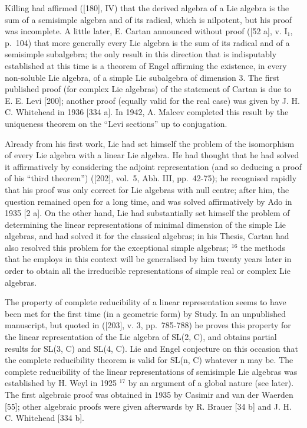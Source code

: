 Killing had affirmed ({[}180{]}, IV) that the derived algebra of a Lie algebra is the sum of a semisimple algebra and of its radical, which is nilpotent, but his proof was incomplete. A little later, E. Cartan announced without proof ({[}52 a{]}, v. I₁, p.~104) that more generally every Lie algebra is the sum of its radical and of a semisimple subalgebra; the only result in this direction that is indisputably established at this time is a theorem of Engel affirming the existence, in every non-soluble Lie algebra, of a simple Lie subalgebra of dimension 3. The first published proof (for complex Lie algebras) of the statement of Cartan is due to E. E. Levi {[}200{]}; another proof (equally valid for the real case) was given by J. H. C. Whitehead in 1936 {[}334 a{]}. In 1942, A. Malcev completed this result by the uniqueness theorem on the ``Levi sections'' up to conjugation.

Already from his first work, Lie had set himself the problem of the isomorphism of every Lie algebra with a linear Lie algebra. He had thought that he had solved it affirmatively by considering the adjoint representation (and so deducing a proof of his ``third theorem'') ({[}202{]}, vol.~5, Abh. III, pp.~42-75); he recognised rapidly that his proof was only correct for Lie algebras with null centre; after him, the question remained open for a long time, and was solved affirmatively by Ado in 1935 {[}2 a{]}. On the other hand, Lie had substantially set himself the problem of determining the linear representations of minimal dimension of the simple Lie algebras, and had solved it for the classical algebras; in his Thesis, Cartan had also resolved this problem for the exceptional simple algebras; \(^{16}\) the methods that he employs in this context will be generalised by him twenty years later in order to obtain all the irreducible representations of simple real or complex Lie algebras.

The property of complete reducibility of a linear representation seems to have been met for the first time (in a geometric form) by Study. In an unpublished manuscript, but quoted in ({[}203{]}, v. 3, pp.~785-788) he proves this property for the linear representation of the Lie algebra of SL(2, C), and obtains partial results for SL(3, C) and SL(4, C). Lie and Engel conjecture on this occasion that the complete reducibility theorem is valid for SL(n, C) whatever n may be. The complete reducibility of the linear representations of semisimple Lie algebras was established by H. Weyl in 1925 \(^{17}\) by an argument of a global nature (see later). The first algebraic proof was obtained in 1935 by Casimir and van der Waerden {[}55{]}; other algebraic proofs were given afterwards by R. Brauer {[}34 b{]} and J. H. C. Whitehead {[}334 b{]}.

